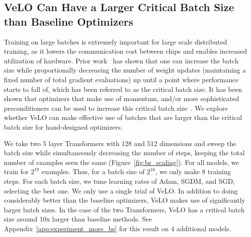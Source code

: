 \documentclass[11pt]{article}
\begin{document}
\subsection{VeLO Can Have a Larger Critical Batch Size than Baseline Optimizers} 
\label{sec:bs} 
Training on large batches is extremely important for large scale distributed training, as it lowers the communication cost between chips and enables increased utilization of hardware.
Prior work~\citep{shallue2018measuring, mccandlish2018empirical, zhang2019algorithmic} has shown that one can increase the batch size while proportionally decreasing the number of weight updates (maintaining a fixed number of total gradient evaluations) up until a point where performance starts to fall of, which has been referred to as the critical batch size.
It has been shown that optimizers that make use of momentum, and/or more sophisticated preconditioners can be used to increase this critical batch size~\citep{zhang2019algorithmic}. 
We explore whether VeLO can make effective use of batches that are larger than the critical batch size for hand-designed optimizers.

We take two 5 layer Transformers with 128 and 512 dimensions and sweep the batch size while simultaneously decreasing the number of steps, keeping the total number of examples seen the same (Figure~\ref{fig:bs_scaling}).
For all models, we train for $2^{19}$ examples.
Thus, for a batch size of $2^{16}$, we only make 8 training steps.
For each batch size, we tune learning rates of Adam, SGDM, and SGD, selecting the best one. We only use a single trial of VeLO.
In addition to doing considerably better than the baseline optimizers, VeLO makes use of significantly larger batch sizes.
In the case of the two Transformers, VeLO has a critical batch size around 10x larger than baseline methods. See Appendix~\ref{app:experiment_more_bs} for this result on 4 additional models.
\end{document}
